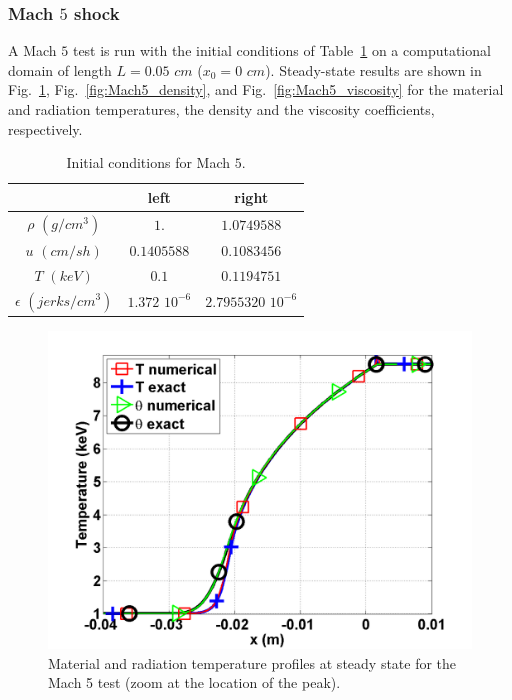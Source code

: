 \documentclass[review]{elsarticle}
\newcommand{\fig}[1]{Fig.~\ref{#1}}                      %
\newcommand{\tbl}[1]{Table~\ref{#1}}                     %
\begin{document}
\subsubsection{Mach $5$ shock}

A Mach $5$ test is run with the initial conditions of \tbl{tbl:table6} on a computational domain of length $L=0.05$ $cm$ ($x_0 = 0$ $cm$). Steady-state results are shown in \fig{fig:Mach5_temp}, \fig{fig:Mach5_density}, and \fig{fig:Mach5_viscosity} for the material and radiation temperatures, the density and the viscosity coefficients, respectively.
\begin{table}[H]
\caption{\label{tbl:table6} Initial conditions for Mach $5$.}
\begin{center}
\begin{tabular}{|c|c|c|}
\hline 
 & left  & right \\ \hline
$\rho$ $(g/cm^3)$ &$1.$ & $1.0749588$ \\ \hline
$u$ $(cm/sh)$& $0.1405588$ & $0.1083456$ \\ \hline
$T$ $(keV)$& $0.1$ & $0.1194751$\\ \hline
$\epsilon$ $(jerks/cm^3)$ & $1.372$ $10^{-6}$ & $2.7955320$ $10^{-6}$\\
\hline
\end{tabular}  
\end{center}  
\end{table}
\begin{figure}[H]
                \centering
                \includegraphics[width=\textwidth]{figs/Mach_5_nel_1000_temperature.png}
        \caption{Material and radiation temperature profiles at steady state for the Mach 5 test (zoom at the location of the peak).}\label{fig:Mach5_temp}
\end{figure}
\end{document}

